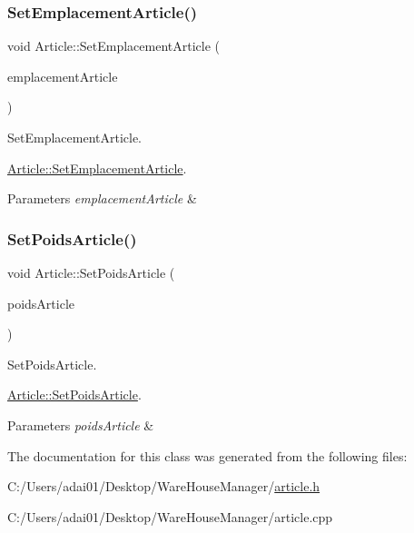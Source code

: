 \subsubsection{\texorpdfstring{Set\+Emplacement\+Article()}{SetEmplacementArticle()}}
{\footnotesize\ttfamily void Article\+::\+Set\+Emplacement\+Article (\begin{DoxyParamCaption}\item[{Q\+String}]{emplacement\+Article }\end{DoxyParamCaption})}



Set\+Emplacement\+Article. 

\mbox{\hyperlink{class_article_ae543837747d1022bd91afb5ca7e7cc32}{Article\+::\+Set\+Emplacement\+Article}}.


\begin{DoxyParams}{Parameters}
{\em emplacement\+Article} & \\
\hline
\end{DoxyParams}
\mbox{\label{class_article_af2412d92eb7d53ca7566755a900653c0}} 
\subsubsection{\texorpdfstring{Set\+Poids\+Article()}{SetPoidsArticle()}}
{\footnotesize\ttfamily void Article\+::\+Set\+Poids\+Article (\begin{DoxyParamCaption}\item[{int}]{poids\+Article }\end{DoxyParamCaption})}



Set\+Poids\+Article. 

\mbox{\hyperlink{class_article_af2412d92eb7d53ca7566755a900653c0}{Article\+::\+Set\+Poids\+Article}}.


\begin{DoxyParams}{Parameters}
{\em poids\+Article} & \\
\hline
\end{DoxyParams}


The documentation for this class was generated from the following files\+:\begin{DoxyCompactItemize}
\item 
C\+:/\+Users/adai01/\+Desktop/\+Ware\+House\+Manager/\mbox{\hyperlink{article_8h}{article.\+h}}\item 
C\+:/\+Users/adai01/\+Desktop/\+Ware\+House\+Manager/article.\+cpp\end{DoxyCompactItemize}
